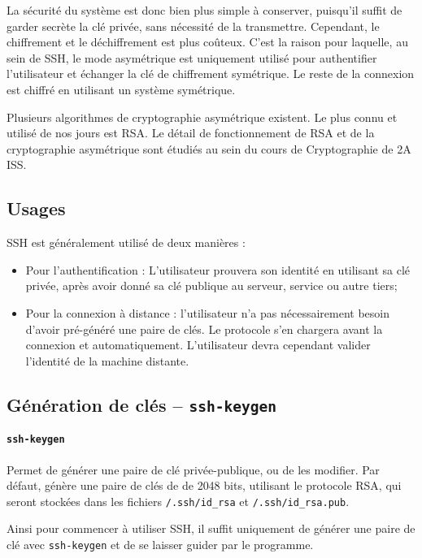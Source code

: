 La sécurité du système est donc bien plus simple à conserver, puisqu'il suffit de garder secrète la clé privée, sans nécessité de la transmettre. Cependant, le chiffrement et le déchiffrement est plus coûteux. C'est la raison pour laquelle, au sein de SSH, le mode asymétrique est uniquement utilisé pour authentifier l'utilisateur et échanger la clé de chiffrement symétrique. Le reste de la connexion est chiffré en utilisant un système symétrique.

Plusieurs algorithmes de cryptographie asymétrique existent. Le plus connu et utilisé de nos jours est RSA. Le détail de fonctionnement de RSA et de la cryptographie asymétrique sont étudiés au sein du cours de Cryptographie de 2A ISS.

\newpage
\subsection{Usages}
SSH est généralement utilisé de deux manières :
\begin{itemize}
    \item Pour l'authentification : L'utilisateur prouvera son identité en utilisant sa clé privée, après avoir donné sa clé publique au serveur, service ou autre tiers;
    \item Pour la connexion à distance : l'utilisateur n'a pas nécessairement besoin d'avoir pré-généré une paire de clés. Le protocole s'en chargera avant la connexion et automatiquement. L'utilisateur devra cependant valider l'identité de la machine distante.
\end{itemize}

\subsection{Génération de clés -- \texttt{ssh-keygen}}

\paragraph{\texttt{ssh-keygen}} 
Permet de générer une paire de clé privée-publique, ou de les modifier.
Par défaut,  génère une paire de clés de de 2048 bits, utilisant le protocole RSA, qui seront stockées dans les fichiers \texttt{\tilde/.ssh/id\_rsa} et \texttt{\tilde/.ssh/id\_rsa.pub}.

Ainsi pour commencer à utiliser SSH, il suffit uniquement de générer une paire de clé avec \texttt{ssh-keygen} et de se laisser guider par le programme.

